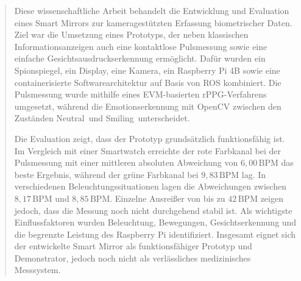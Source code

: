 \documentclass[
   ngerman          %
  ,a4paper          %
  ,12pt
  ,pdftex
  ,disable         %
]{report}
\begin{document}




\begin{abstract}
Diese wissenschaftliche Arbeit behandelt die Entwicklung und Evaluation eines Smart Mirrors zur kameragestützten Erfassung biometrischer Daten. Ziel war die Umsetzung eines Prototyps, der neben klassischen Informationsanzeigen auch eine kontaktlose Pulsmessung sowie eine einfache Gesichtsausdruckserkennung ermöglicht. Dafür wurden ein Spionspiegel, ein Display, eine Kamera, ein Raspberry Pi 4B sowie eine containerisierte Softwarearchitektur auf Basis von ROS kombiniert. Die Pulsmessung wurde mithilfe eines EVM-basierten rPPG-Verfahrens umgesetzt, während die Emotionserkennung mit OpenCV zwischen den Zuständen \glqq Neutral\grqq\ und \glqq Smiling\grqq\ unterscheidet.

Die Evaluation zeigt, dass der Prototyp grundsätzlich funktionsfähig ist. Im Vergleich mit einer Smartwatch erreichte der rote Farbkanal bei der Pulsmessung mit einer mittleren absoluten Abweichung von \(6{,}00\, \mathrm{BPM}\) das beste Ergebnis, während der grüne Farbkanal bei \(9{,}83\, \mathrm{BPM}\) lag. In verschiedenen Beleuchtungssituationen lagen die Abweichungen zwischen \(8{,}17\, \mathrm{BPM}\) und \(8{,}85\, \mathrm{BPM}\). Einzelne Ausreißer von bis zu \(42\, \mathrm{BPM}\) zeigen jedoch, dass die Messung noch nicht durchgehend stabil ist. Als wichtigste Einflussfaktoren wurden Beleuchtung, Bewegungen, Gesichtserkennung und die begrenzte Leistung des Raspberry Pi identifiziert. Insgesamt eignet sich der entwickelte Smart Mirror als funktionsfähiger Prototyp und Demonstrator, jedoch noch nicht als verlässliches medizinisches Messsystem.
\end{abstract}

\newpage
\tableofcontents           %
\enlargethispage{1cm}

\listoffigures             %
\listoftables
 
\end{document}
